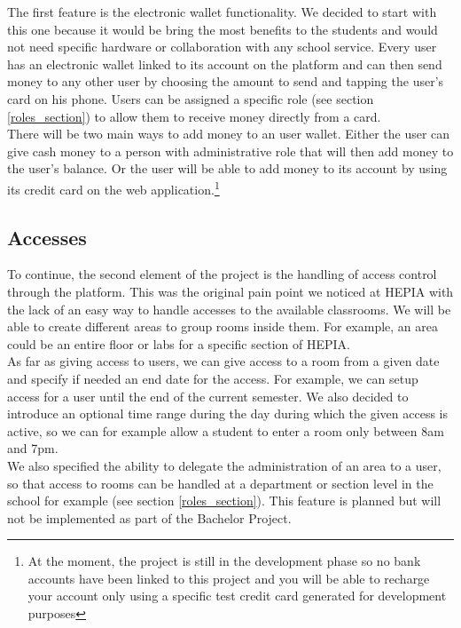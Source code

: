 \documentclass[11pt,a4paper]{report}
\begin{document}
The first feature is the electronic wallet functionality. We decided to start with this one because it would be bring the most benefits to the students and would not need specific hardware or collaboration with any school service. Every user has an electronic wallet linked to its account on the platform and can then send money to any other user by choosing the amount to send and tapping the user's card on his phone. Users can be assigned a specific role (see section \ref{roles_section}) to allow them to receive money directly from a card.\\

There will be two main ways to add money to an user wallet. Either the user can give cash money to a person with administrative role that will then add money to the user's balance. Or the user will be able to add money to its account by using its credit card on the web application.\footnote{At the moment, the project is still in the development phase so no bank accounts have been linked to this project and you will be able to recharge your account only using a specific test credit card generated for development purposes}

\subsection{Accesses}

To continue, the second element of the project is the handling of access control through the platform. This was the original pain point we noticed at HEPIA with the lack of an easy way to handle accesses to the available classrooms. We will be able to create different areas to group rooms inside them. For example, an area could be an entire floor or labs for a specific section of HEPIA.\\

As far as giving access to users, we can give access to a room from a given date and specify if needed an end date for the access. For example, we can setup access for a user until the end of the current semester. We also decided to introduce an optional time range during the day during which the given access is active, so we can for example allow a student to enter a room only between 8am and 7pm. \\

We also specified the ability to delegate the administration of an area to a user, so that access to rooms can be handled at a department or section level in the school for example (see section \ref{roles_section}). This feature is planned but will not be implemented as part of the Bachelor Project.
\end{document}
